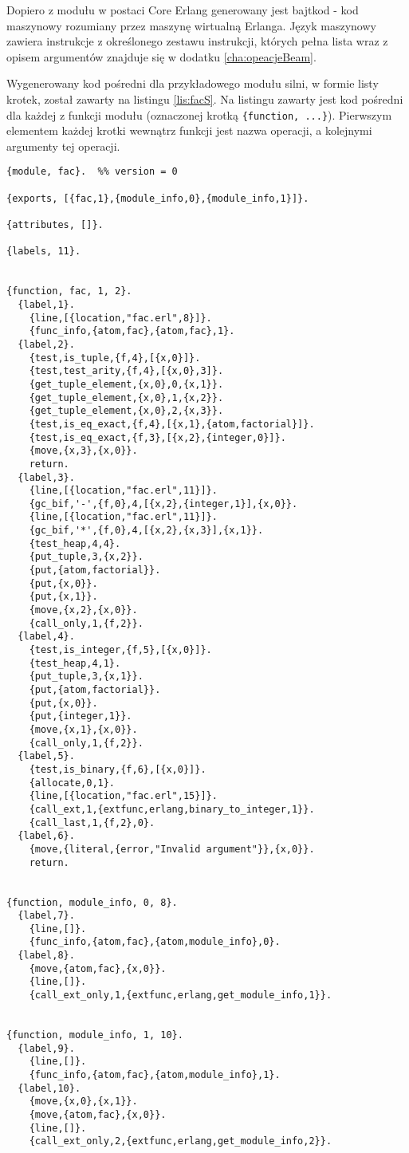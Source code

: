 Dopiero z modułu w postaci Core Erlang generowany jest bajtkod - kod maszynowy rozumiany przez maszynę wirtualną Erlanga. Język maszynowy zawiera instrukcje z określonego zestawu instrukcji, których pełna lista wraz z opisem argumentów znajduje się w dodatku \ref{cha:opeacjeBeam}.

Wygenerowany kod pośredni dla przykładowego modułu silni, w formie listy krotek, został zawarty na listingu \ref{lis:facS}. Na listingu zawarty jest kod pośredni dla każdej z funkcji modułu (oznaczonej krotką \texttt{\{function, ...\}}). Pierwszym elementem każdej krotki wewnątrz funkcji jest nazwa operacji, a kolejnymi argumenty tej operacji.

\begin{lstlisting}[style=erlang, caption=\emph{Bytecode} modułu fac, label=facS]
{module, fac}.  %% version = 0

{exports, [{fac,1},{module_info,0},{module_info,1}]}.

{attributes, []}.

{labels, 11}.


{function, fac, 1, 2}.
  {label,1}.
    {line,[{location,"fac.erl",8}]}.
    {func_info,{atom,fac},{atom,fac},1}.
  {label,2}.
    {test,is_tuple,{f,4},[{x,0}]}.
    {test,test_arity,{f,4},[{x,0},3]}.
    {get_tuple_element,{x,0},0,{x,1}}.
    {get_tuple_element,{x,0},1,{x,2}}.
    {get_tuple_element,{x,0},2,{x,3}}.
    {test,is_eq_exact,{f,4},[{x,1},{atom,factorial}]}.
    {test,is_eq_exact,{f,3},[{x,2},{integer,0}]}.
    {move,{x,3},{x,0}}.
    return.
  {label,3}.
    {line,[{location,"fac.erl",11}]}.
    {gc_bif,'-',{f,0},4,[{x,2},{integer,1}],{x,0}}.
    {line,[{location,"fac.erl",11}]}.
    {gc_bif,'*',{f,0},4,[{x,2},{x,3}],{x,1}}.
    {test_heap,4,4}.
    {put_tuple,3,{x,2}}.
    {put,{atom,factorial}}.
    {put,{x,0}}.
    {put,{x,1}}.
    {move,{x,2},{x,0}}.
    {call_only,1,{f,2}}.
  {label,4}.
    {test,is_integer,{f,5},[{x,0}]}.
    {test_heap,4,1}.
    {put_tuple,3,{x,1}}.
    {put,{atom,factorial}}.
    {put,{x,0}}.
    {put,{integer,1}}.
    {move,{x,1},{x,0}}.
    {call_only,1,{f,2}}.
  {label,5}.
    {test,is_binary,{f,6},[{x,0}]}.
    {allocate,0,1}.
    {line,[{location,"fac.erl",15}]}.
    {call_ext,1,{extfunc,erlang,binary_to_integer,1}}.
    {call_last,1,{f,2},0}.
  {label,6}.
    {move,{literal,{error,"Invalid argument"}},{x,0}}.
    return.


{function, module_info, 0, 8}.
  {label,7}.
    {line,[]}.
    {func_info,{atom,fac},{atom,module_info},0}.
  {label,8}.
    {move,{atom,fac},{x,0}}.
    {line,[]}.
    {call_ext_only,1,{extfunc,erlang,get_module_info,1}}.


{function, module_info, 1, 10}.
  {label,9}.
    {line,[]}.
    {func_info,{atom,fac},{atom,module_info},1}.
  {label,10}.
    {move,{x,0},{x,1}}.
    {move,{atom,fac},{x,0}}.
    {line,[]}.
    {call_ext_only,2,{extfunc,erlang,get_module_info,2}}.
\end{lstlisting}

